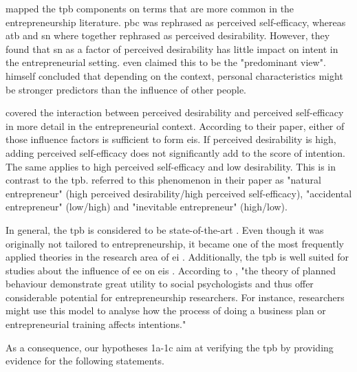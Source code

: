 \citet{krueger2000competing} mapped the \ac{tpb} components on terms that are more common in the entrepreneurship literature. \ac{pbc} was rephrased as perceived self-efficacy, whereas \ac{atb} and \ac{sn} where together rephrased as perceived desirability. However, they found that \ac{sn} as a factor of perceived desirability has little impact on intent in the entrepreneurial setting. \citet{fitzsimmons2011interaction} even claimed this to be the "predominant view". \citet{ajzen1991theory} himself concluded that depending on the context, personal characteristics might be stronger predictors than the influence of other people.

\citet{fitzsimmons2011interaction} covered the interaction between perceived desirability and perceived self-efficacy in more detail in the entrepreneurial context. According to their paper, either of those influence factors is sufficient to form \acp{ei}. If perceived desirability is high, adding perceived self-efficacy does not significantly add to the score of intention. The same applies to high perceived self-efficacy and low desirability. This is in contrast to the \ac{tpb}. \citet{fitzsimmons2011interaction} referred to this phenomenon in their paper as "natural entrepreneur" (high perceived desirability/high perceived self-efficacy), "accidental entrepreneur" (low/high) and "inevitable entrepreneur" (high/low).

In general, the \acl{tpb} is considered to be state-of-the-art \citep{krueger2000competing}. Even though it was originally not tailored to entrepreneurship, it became one of the most frequently applied theories in the research area of \ac{ei} \citep{fayolle2015impact}. Additionally, the \ac{tpb} is well suited for studies about the influence of \ac{ee} on \acp{ei} \citep{maresch2016impact}.
According to \citet[p. 327]{krueger1993entrepreneurial}, "the theory of planned behaviour demonstrate great utility to social psychologists and thus offer considerable potential for entrepreneurship researchers. For instance, researchers might use this model to analyse how the process of doing a business plan or entrepreneurial training affects intentions."

As a consequence, our hypotheses 1a-1c aim at verifying the \ac{tpb} by providing evidence for the following statements.

